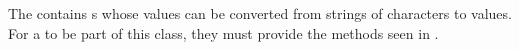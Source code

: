 \subsubsection{\texorpdfstring{}{\texttt{Read}}}\label{subsubsec:Read_Typeclass}
The   contains s whose values can be converted from strings of characters to values.
For a  to be part of this class, they must provide the methods seen in .

\subsubsection{\texorpdfstring{}{\texttt{Num}}}\label{subsubsec:Num_Typeclass}
\subsubsection{\texorpdfstring{}{\texttt{Integral}}}\label{subsubsec:Integral_Typeclass}
\subsubsection{\texorpdfstring{}{\texttt{Fractional}}}\label{subsubsec:Fractional_Typeclass}
